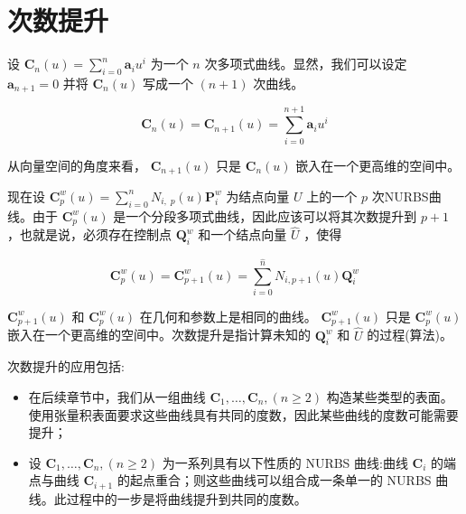\documentclass[../main.tex]{subfiles}
\begin{document}
\section{次数提升}

设 \({\mathbf{C}}_{n}\left( u\right)  = \mathop{\sum }\limits_{{i = 0}}^{n}{\mathbf{a}}_{i}{u}^{i}\) 为一个 \(n\) 次多项式曲线。显然，我们可以设定 \({\mathbf{a}}_{n + 1} = 0\) 并将 \({\mathbf{C}}_{n}\left( u\right)\) 写成一个 \(\left( {n + 1}\right)\) 次曲线。

\[
{\mathbf{C}}_{n}\left( u\right)  = {\mathbf{C}}_{n + 1}\left( u\right)  = \mathop{\sum }\limits_{{i = 0}}^{{n + 1}}{\mathbf{a}}_{i}{u}^{i}
\]

从向量空间的角度来看， \({\mathbf{C}}_{n + 1}\left( u\right)\) 只是 \({\mathbf{C}}_{n}\left( u\right)\) 嵌入在一个更高维的空间中。



现在设 \({\textbf{C}}_{p}^{w}\left( u\right)  = \mathop{\sum }\limits_{{i = 0}}^{n}{N}_{i,\;p}\left( u\right) {\textbf{P}}_{i}^{w}\) 为结点向量 \(U\) 上的一个 \(p\) 次NURBS曲线。由于 \({\mathbf{C}}_{p}^{w}\left( u\right)\) 是一个分段多项式曲线，因此应该可以将其次数提升到 \(p + 1\) ，也就是说，必须存在控制点 \({\mathbf{Q}}_{i}^{w}\) 和一个结点向量 \(\widehat{U}\) ，使得

\[
{\mathbf{C}}_{p}^{w}\left( u\right)  = {\mathbf{C}}_{p + 1}^{w}\left( u\right)  = \mathop{\sum }\limits_{{i = 0}}^{\widehat{n}}{N}_{i,p + 1}\left( u\right) {\mathbf{Q}}_{i}^{w} \tag{5.31}
\]

\({\mathbf{C}}_{p + 1}^{w}\left( u\right)\) 和 \({\mathbf{C}}_{p}^{w}\left( u\right)\) 在几何和参数上是相同的曲线。 \({\mathbf{C}}_{p + 1}^{w}\left( u\right)\) 只是 \({\mathbf{C}}_{p}^{w}\left( u\right)\) 嵌入在一个更高维的空间中。次数提升是指计算未知的 \({\mathbf{Q}}_{i}^{w}\) 和 \(\widehat{U}\) 的过程(算法)。

次数提升的应用包括:







\begin{itemize}
\item 在后续章节中，我们从一组曲线 \({\mathbf{C}}_{1},\ldots ,{\mathbf{C}}_{n},\left( {n \geq  2}\right)\) 构造某些类型的表面。使用张量积表面要求这些曲线具有共同的度数，因此某些曲线的度数可能需要提升；
\end{itemize}

\begin{itemize}
\item 设 \({\mathbf{C}}_{1},\ldots ,{\mathbf{C}}_{n},\left( {n \geq  2}\right)\) 为一系列具有以下性质的 NURBS 曲线:曲线 \({\mathbf{C}}_{i}\) 的端点与曲线 \({\mathbf{C}}_{i + 1}\) 的起点重合；则这些曲线可以组合成一条单一的 NURBS 曲线。此过程中的一步是将曲线提升到共同的度数。
\end{itemize}
\end{document}
